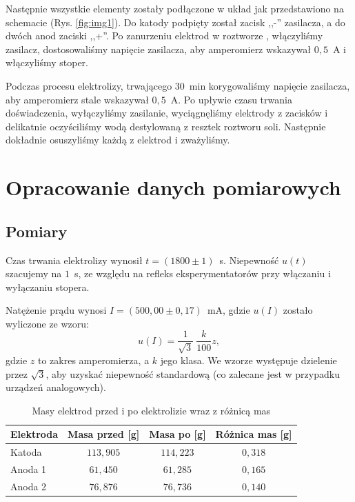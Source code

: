 \documentclass[12pt,a4paper]{article}
\numberwithin{equation}{section}
\begin{document}
Następnie wszystkie elementy zostały podłączone w układ jak przedstawiono na schemacie (Rys. \ref{fig:img1}). Do katody podpięty został zacisk ,,-'' zasilacza, a do dwóch anod zaciski ,,+''. Po zanurzeniu elektrod w roztworze , włączyliśmy zasilacz, dostosowaliśmy napięcie zasilacza, aby amperomierz wskazywał $0,5$~A i włączyliśmy stoper. 

Podczas procesu elektrolizy, trwającego $30$~min korygowaliśmy napięcie zasilacza, aby amperomierz stale wskazywał $0,5$~A. Po upływie czasu trwania doświadczenia, wyłączyliśmy zasilanie, wyciągnęliśmy elektrody z zacisków i delikatnie oczyściliśmy wodą destylowaną z resztek roztworu soli. Następnie dokładnie osuszyliśmy każdą z elektrod i zważyliśmy.

\section{Opracowanie danych pomiarowych}
\subsection{Pomiary}

Czas trwania elektrolizy wynosił $t = (1800 \pm 1)$~s. Niepewność $u(t)$ szacujemy na $1$~s, ze względu na refleks eksperymentatorów przy włączaniu i wyłączaniu stopera.

Natężenie prądu wynosi $I = (500,00 \pm 0,17)$~mA, gdzie $u(I)$ zostało wyliczone ze wzoru:
\begin{equation}
	u(I) = \frac{1}{\sqrt{3}}~\frac{k}{100} z,
\end{equation}
gdzie $z$ to zakres amperomierza, a $k$ jego klasa. We wzorze występuje dzielenie przez $\sqrt{3}$, aby uzyskać niepewność standardową (co zalecane jest w przypadku urządzeń analogowych).
\pagebreak

\begin{table}[!ht]
	\caption{Masy elektrod przed i po elektrolizie wraz z różnicą mas}
	\centering
	\begin{tabular}{l|c|c|c}
		\hline Elektroda & Masa przed [g] & Masa po [g] & Różnica mas [g] \\ \hline \hline
		Katoda & $113,905$ & $114,223$ & $0,318$ \\
		Anoda 1 & $61,450$ & $61,285$ & $0,165$ \\
		Anoda 2 & $76,876$ & $76,736$ & $0,140$ \\ \hline
	\end{tabular}
	\label{tab:tab1}
\end{table}
\end{document}
